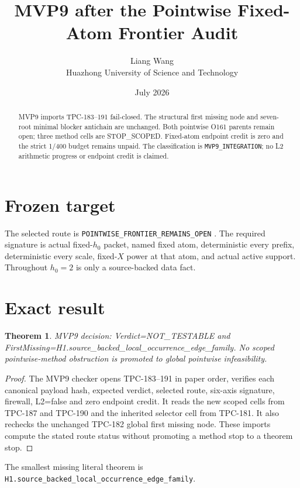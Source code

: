 \documentclass[11pt]{article}
\title{\textbf{MVP9 after the Pointwise Fixed-Atom Frontier Audit}}
\author{Liang Wang\\Huazhong University of Science and Technology}
\date{July 2026}
\newtheorem{theorem}{Theorem}
\begin{document}
\maketitle
\begin{abstract}
MVP9 imports TPC-183--191 fail-closed.  The structural first missing node and seven-root minimal blocker antichain are unchanged. Both pointwise O161 parents remain open; three method cells are STOP\_\allowbreak{}SCOPED.  Fixed-atom endpoint credit is zero and the strict 1/400 budget remains unpaid.
The classification is \texttt{MVP9\_\allowbreak{}INTEGRATION}; no L2 arithmetic
progress or endpoint credit is claimed.
\end{abstract}

\section{Frozen target}
The selected route is \texttt{POINTWISE\_\allowbreak{}FRONTIER\_\allowbreak{}REMAINS\_\allowbreak{}OPEN} \citep{TPC182}.  The required
signature is actual fixed-$h_0$ packet, named fixed atom, deterministic every
prefix, deterministic every scale, fixed-$X$ power at that atom, and actual
active support.  Throughout $h_0=2$ is only a source-backed data fact.

\section{Exact result}
\begin{theorem}
MVP9 decision: Verdict=NOT\_\allowbreak{}TESTABLE and FirstMissing=H1.source\_\allowbreak{}backed\_\allowbreak{}local\_\allowbreak{}occurrence\_\allowbreak{}edge\_\allowbreak{}family.  No scoped pointwise-method obstruction is promoted to global pointwise infeasibility.
\end{theorem}
\begin{proof}
The MVP9 checker opens TPC-183--191 in paper order, verifies each canonical payload hash, expected verdict, selected route, six-axis signature, firewall, L2=false and zero endpoint credit.  It reads the new scoped cells from TPC-187 and TPC-190 and the inherited selector cell from TPC-181.  It also rechecks the unchanged TPC-182 global first missing node.  These imports compute the stated route status without promoting a method stop to a theorem stop.
\end{proof}

The smallest missing literal theorem is
\texttt{H1.source\_\allowbreak{}backed\_\allowbreak{}local\_\allowbreak{}occurrence\_\allowbreak{}edge\_\allowbreak{}family}.
\end{document}
